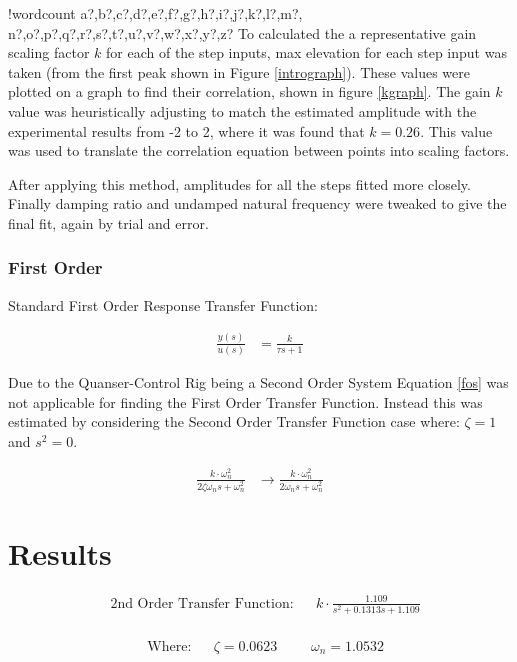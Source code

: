 \documentclass[11pt]{article}
\newcounter{words}
\newenvironment{counted}{%
  \setcounter{words}{0}
  \SearchList!{wordcount}{\stepcounter{words}}
    {a?,b?,c?,d?,e?,f?,g?,h?,i?,j?,k?,l?,m?,
    n?,o?,p?,q?,r?,s?,t?,u?,v?,w?,x?,y?,z?}
  \UndoBoundary{'}
  \SearchOrder{p;}}{%
  \StopSearching}
\begin{document}
\begin{counted}
To calculated the a representative gain scaling factor \(k\) for each of
the step inputs, max elevation for each step input was taken (from the
first peak shown in Figure \ref{intrograph}). These values were plotted
on a graph to find their correlation, shown in figure \ref{kgraph}. The
gain \(k\) value was heuristically adjusting to match the estimated
amplitude with the experimental results from -2 to 2, where it was found
that \(k = 0.26\). This value was used to translate the correlation
equation between points into scaling factors.

After applying this method, amplitudes for all the steps fitted more
closely. Finally damping ratio and undamped natural frequency were
tweaked to give the final fit, again by trial and error.

\subsubsection{First Order}\label{first-order}

Standard First Order Response Transfer Function:

\begin{align}
 \frac { y(s) }{ u(s) } &=\frac { k }{ \tau s+1 }
\label{fos}
\end{align}

Due to the Quanser-Control Rig being a Second Order System Equation
\ref{fos} was not applicable for finding the First Order Transfer
Function. Instead this was estimated by considering the Second Order
Transfer Function case where: \(\zeta =1\) and \(s^2=0\).

\begin{align}
\frac { k\cdot \omega_{ n }^{ 2 } }{ 2\zeta \omega_{ n }s+\omega_{ n }^{ 2 } } &\rightarrow \frac { k\cdot \omega_{ n }^{ 2 } }{ 2\omega_{ n }s+\omega_{ n }^{ 2 } }
\end{align}

\section{Results}\label{results}

\begin{align}
&\text{2nd Order Transfer Function}: && k \cdot \frac { 1.109 }{ s^{ 2 }+0.1313s+1.109 }
\end{align}

\begin{align*}
\\
&\text{Where:} &&\zeta = 0.0623 &&& \omega_n = 1.0532
\\
\end{align*}


\end{counted}
\end{document}
